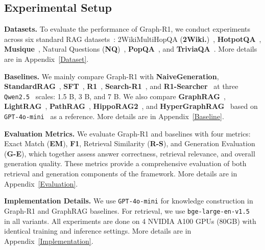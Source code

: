 \documentclass{article}
\theoremstyle{plain}
\theoremstyle{definition}
\theoremstyle{remark}
\begin{document}
\subsection{Experimental Setup}

\textbf{Datasets. }
To evaluate the performance of Graph-R1, we conduct experiments across six standard RAG datasets~\citep{FlashRAG}:
2WikiMultiHopQA (\textbf{2Wiki.})~\citep{2WikiMultiHopQA}, \textbf{HotpotQA}~\citep{HotpotQA}, \textbf{Musique}~\citep{Musique}, Natural Questions (\textbf{NQ})~\citep{NQ}, \textbf{PopQA}~\citep{PopQA}, and \textbf{TriviaQA}~\citep{TriviaQA}. More details are in Appendix~\ref{Dataset}.  

\textbf{Baselines. }
We mainly compare Graph-R1 with \textbf{NaiveGeneration}, \textbf{StandardRAG}~\citep{RAG}, \textbf{SFT}~\citep{SFT}, \textbf{R1}~\citep{GRPO}, \textbf{Search-R1}~\citep{Search-R1}, and \textbf{R1-Searcher}~\citep{R1-Searcher} at three \texttt{Qwen2.5}~\citep{Qwen2.5} scales: 1.5 B, 3 B, and 7 B. We also compare \textbf{GraphRAG}~\citep{GraphRAG}, \textbf{LightRAG}~\citep{LightRAG}, \textbf{PathRAG}~\citep{PathRAG}, \textbf{HippoRAG2}~\citep{HippoRAG2}, and \textbf{HyperGraphRAG}~\citep{HyperGraphRAG} based on \texttt{GPT-4o-mini}~\citep{GPT-4o} as a reference. More details are in Appendix~\ref{Baseline}.

\textbf{Evaluation Metrics. }
We evaluate Graph-R1 and baselines with four metrics: Exact Match (\textbf{EM}), \textbf{F1}, Retrieval Similarity (\textbf{R-S}), and Generation Evaluation (\textbf{G-E}), which together assess answer correctness, retrieval relevance, and overall generation quality. These metrics provide a comprehensive evaluation of both retrieval and generation components of the framework. More details are in Appendix~\ref{Evaluation}.

\textbf{Implementation Details. }
We use \texttt{GPT-4o-mini} for knowledge construction in Graph-R1 and GraphRAG baselines. For retrieval, we use \texttt{bge-large-en-v1.5}~\citep{BAAIembedding} in all variants. All experiments are done on 4 NVIDIA A100 GPUs (80GB) with identical training and inference settings. More details are in Appendix~\ref{Implementation}.
\end{document}
